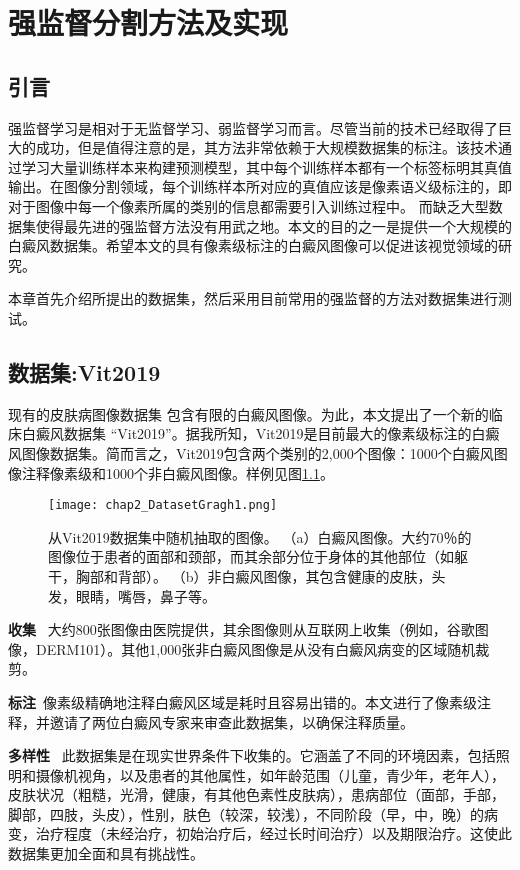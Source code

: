 \chapter{强监督分割方法及实现}
\section{引言}
强监督学习是相对于无监督学习、弱监督学习而言。尽管当前的技术已经取得了巨大的成功，但是值得注意的是，其方法非常依赖于大规模数据集的标注。该技术通过学习大量训练样本来构建预测模型，其中每个训练样本都有一个标签标明其真值输出。在图像分割领域，每个训练样本所对应的真值应该是像素语义级标注的，即对于图像中每一个像素所属的类别的信息都需要引入训练过程中。 而缺乏大型数据集使得最先进的强监督方法没有用武之地。本文的目的之一是提供一个大规模的白癜风数据集。希望本文的具有像素级标注的白癜风图像可以促进该视觉领域的研究。

本章首先介绍所提出的数据集，然后采用目前常用的强监督的方法对数据集进行测试。
\section{数据集:Vit2019}
现有的皮肤病图像数据集 \cite {mendoncca2013ph,codella2018skin,sun2016benchmark}包含有限的白癜风图像。为此，本文提出了一个新的临床白癜风数据集 “Vit2019”。据我所知，Vit2019是目前最大的像素级标注的白癜风图像数据集。简而言之，Vit2019包含两个类别的2,000个图像：1000个白癜风图像注释像素级和1000个非白癜风图像。样例见图\ref{fig:chap2_DatasetGragh1}。
\begin{figure}[htbp]
\begin{center}
\texttt{[image: chap2\_DatasetGragh1.png]}
\end{center}
\caption{从Vit2019数据集中随机抽取的图像。 （a）白癜风图像。大约70％的图像位于患者的面部和颈部，而其余部分位于身体的其他部位（如躯干，胸部和背部）。 （b）非白癜风图像，其包含健康的皮肤，头发，眼睛，嘴唇，鼻子等。}
\label{fig:chap2_DatasetGragh1}
\end{figure}

\textbf{收集} ~大约800张图像由医院提供，其余图像则从互联网上收集（例如，谷歌图像，DERM101）。其他1,000张非白癜风图像是从没有白癜风病变的区域随机裁剪。

\textbf{标注}~像素级精确地注释白癜风区域是耗时且容易出错的。本文进行了像素级注释，并邀请了两位白癜风专家来审查此数据集，以确保注释质量。

\textbf {多样性}~ 此数据集是在现实世界条件下收集的。它涵盖了不同的环境因素，包括照明和摄像机视角，以及患者的其他属性，如年龄范围（儿童，青少年，老年人），皮肤状况（粗糙，光滑，健康，有其他色素性皮肤病），患病部位（面部，手部，脚部，四肢，头皮），性别，肤色（较深，较浅），不同阶段（早，中，晚）的病变，治疗程度（未经治疗，初始治疗后，经过长时间治疗）以及期限治疗。这使此数据集更加全面和具有挑战性。

